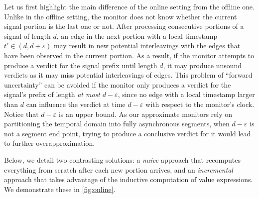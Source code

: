Let us first highlight the main difference of the online setting from the offline one.
Unlike in the offline setting, the monitor does not know whether the current signal portion is the last one or not.
After processing consecutive portions of a signal of length $d$, an edge in the next portion with a local timestamp $t' \in (d, d+\varepsilon)$ may result in new potential interleavings with the edges that have been observed in the current portion.
As a result, if the monitor attempts to produce a verdict for the signal prefix until length $d$, it may produce unsound verdicts as it may miss potential interleavings of edges.
This problem of ``forward uncertainty'' can be avoided if the monitor only produces a verdict for the signal's prefix of length \emph{at most} $d-\varepsilon$, since no edge with a local timestamp larger than $d$ can influence the verdict at time $d-\varepsilon$ with respect to the monitor's clock.
Notice that $d-\varepsilon$ is an upper bound.
As our approximate monitors rely on partitioning the temporal domain into fully asynchronous segments, when $d-\varepsilon$ is not a segment end point, trying to produce a conclusive verdict for it would lead to further overapproximation.

Below, we detail two contrasting solutions: a \emph{naive} approach that recomputes everything from scratch after each new portion arrives, and an \emph{incremental} approach that takes advantage of the inductive computation of value expressions.
We demonstrate these in \cref{fig:online}.

